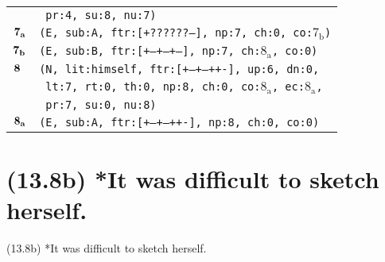 \documentclass{article}
\begin{document}
\begin{minipage}{\textwidth}
{\begin{tabular}{|r|l|}
    & \texttt{\texttt{~pr:4,~su:8,~nu:7)}} \\
    ${\textbf{\textrm{7}}_{\textbf{\textrm{a}}}}$ & \texttt{\texttt{(E,~sub:A,~ftr:[+??????--],~np:7,~ch:0,~co:${\textrm{7}_{\textrm{b}}}$)}} \\
    ${\textbf{\textrm{7}}_{\textbf{\textrm{b}}}}$ & \texttt{\texttt{(E,~sub:B,~ftr:[+--+--+--],~np:7,~ch:${\textrm{8}_{\textrm{a}}}$,~co:0)}} \\
    ${\textbf{\textrm{8}}_{\phantom{z}}}$ & \texttt{\texttt{(N,~lit:himself,~ftr:[+--+--++-],~up:6,~dn:0,}} \\
    & \texttt{\texttt{~lt:7,~rt:0,~th:0,~np:8,~ch:0,~co:${\textrm{8}_{\textrm{a}}}$,~ec:${\textrm{8}_{\textrm{a}}}$,}} \\
    & \texttt{\texttt{~pr:7,~su:0,~nu:8)}} \\
    ${\textbf{\textrm{8}}_{\textbf{\textrm{a}}}}$ & \texttt{\texttt{(E,~sub:A,~ftr:[+--+--++-],~np:8,~ch:0,~co:0)}} \\
    \hline
  \end{tabular}
  }
\end{minipage}
\bigbreak

\clearpage

%
%

\section*{(13.8b) *It was difficult to sketch herself.}

\bigbreak
\begin{enumerate*}
\item[(13.8b)] *It was difficult to sketch herself.
\end{enumerate*}
\bigbreak
\end{document}

